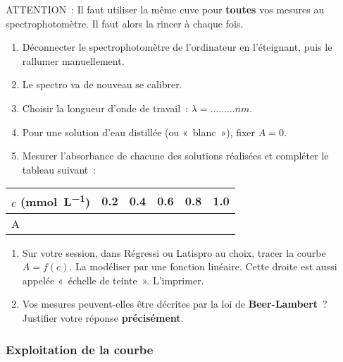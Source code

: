 \documentclass[a4paper, 11pt, final, garamond]{book}
\begin{document}
\begin{rrapp}{}
    \begin{center}
        ATTENTION~: Il faut utiliser la même cuve pour \textbf{toutes} vos
        mesures au spectrophotomètre. Il faut alors la rincer à chaque fois.
    \end{center}
\end{rrapp}
\vspace{-12pt}
\begin{enumerate}
    \item Déconnecter le spectrophotomètre de l'ordinateur en l'éteignant, puis
        le rallumer manuellement.
    \item Le spectro va de nouveau se calibrer.
    \item Choisir la longueur d'onde de travail~: $\lambda = ………\si{nm}$.
    \item Pour une solution d'eau distillée (ou «~blanc~»), fixer $A = 0$.
    \item Mesurer l'absorbance de chacune des solutions réalisées et compléter
        le tableau suivant~:
\end{enumerate}
\begin{center}
    \renewcommand{\arraystretch}{1.3}
    \begin{tabularx}{\linewidth}{|Y*{5}{|Y}|}\hline
        $c$ (\si{mmol.L^{-1}}) &
        \num{0.2} & \num{0.4} & \num{0.6} & \num{0.8} & \num{1.0}
        \\\hline
        A &
          &&&&
        \\\hline
    \end{tabularx}
\end{center}

\begin{enumerate}[resume]
    \item Sur votre session, dans Régressi ou Latispro au choix, tracer la
        courbe $A= f(c)$. La modéliser par une fonction linéaire. Cette droite
        est aussi appelée «~échelle de teinte~». L'imprimer.
    \item Vos mesures peuvent-elles être décrites par la loi de
        \textbf{Beer-Lambert}~? Justifier votre réponse \textbf{précisément}.
\end{enumerate}

\subsubsection{Exploitation de la courbe}
\end{document}
